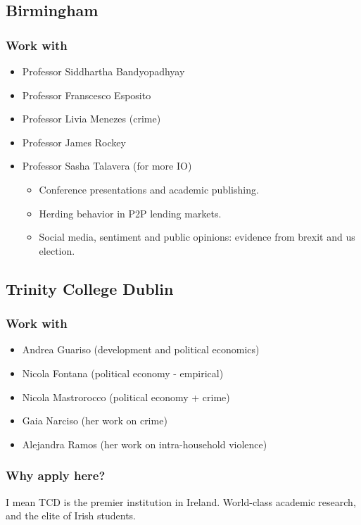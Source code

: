 \documentclass[12pt]{article}
\theoremstyle{plain}
\theoremstyle{plain}
\theoremstyle{plain}
\theoremstyle{plain}
\theoremstyle{plain}
\theoremstyle{plain}
\begin{document}
\subsection{Birmingham}
\label{sec:org9a6ef9f}

\subsubsection{Work with}
\label{sec:org8bf6119}
\begin{itemize}
\item Professor Siddhartha Bandyopadhyay
\item Professor Franscesco Esposito
\item Professor Livia Menezes (crime)
\item Professor James Rockey
\item Professor Sasha Talavera (for more IO)
\begin{itemize}
\item Conference presentations and academic publishing.
\item Herding behavior in P2P lending markets.
\item Social media, sentiment and public opinions: evidence from brexit and us election.
\end{itemize}
\end{itemize}

\subsection{Trinity College Dublin}
\label{sec:org5f4d3a9}

\subsubsection{Work with}
\label{sec:orge79a693}
\begin{itemize}
\item Andrea Guariso (development and political economics)
\item Nicola Fontana (political economy - empirical)
\item Nicola Mastrorocco (political economy + crime)
\item Gaia Narciso (her work on crime)
\item Alejandra Ramos (her work on intra-household violence)
\end{itemize}




\subsubsection{Why apply here?}
\label{sec:org425f714}
I mean TCD is the premier institution in Ireland. World-class academic research, and the elite of Irish students.
\end{document}
